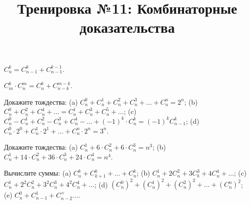 



\title{Тренировка №11: Комбинаторные доказательства}
\maketitle

\begin{problem}
	$C_n^k = C_{n-1}^k + C_{n-1}^{k-1}$.
\end{problem}

\begin{problem}
	$C_m^k \cdot C_n^m = C_n^k + C_{n-k}^{m-k}$.
\end{problem}

\begin{problem}
	Докажите тождества: (a) $C_n^0 + C_n^1 + C_n^2 + C_n^3 + \ldots + C_n^n = 2^n$; (b) $C_n^0 + C_n^2 + C_n^4 + \ldots = C_n^1 + C_n^3 + C_n^5 + \ldots$; (c) $C_n^0 - C_n^1 + C_n^2 - C_n^3 + C_n^4 - \ldots + (-1)^k \cdot C_n^k = (-1)^k C_{n-1}^k$; (d) $C_n^0 \cdot 2^0 + C_n^1 \cdot 2^1 + \ldots + C_n^n \cdot 2^n = 3^n$.
\end{problem}

\begin{problem}
	Докажите тождества: (a) $C_n^1 + 6 \cdot C_n^2 + 6 \cdot C_n^3 = n^3$; (b) $C_n^1 + 14 \cdot C_n^2 + 36 \cdot C_n^3 + 24 \cdot C_n^4 = n^4$.
\end{problem}

\begin{problem}
	Вычислите суммы: (a) $C_n^k + C_{k+1}^k + \ldots + C_n^k$; (b) $C_n^1 + 2 C_n^2 + 3 C_b^3 + 4 C_n^4 + \ldots$; (c) $C_n^1 + 2^2 C_n^2 + 3^2 C_n^3 + 4^2 C_n^4 + \ldots$; (d) $(C_n^0)^2 + (C_n^1)^2 + (C_n^2)^2 + \ldots + (C_n^n)^2$; (e) $C_n^0 + C_{n-1}^1 + C_{n-2}^ + \ldots$.
\end{problem}

